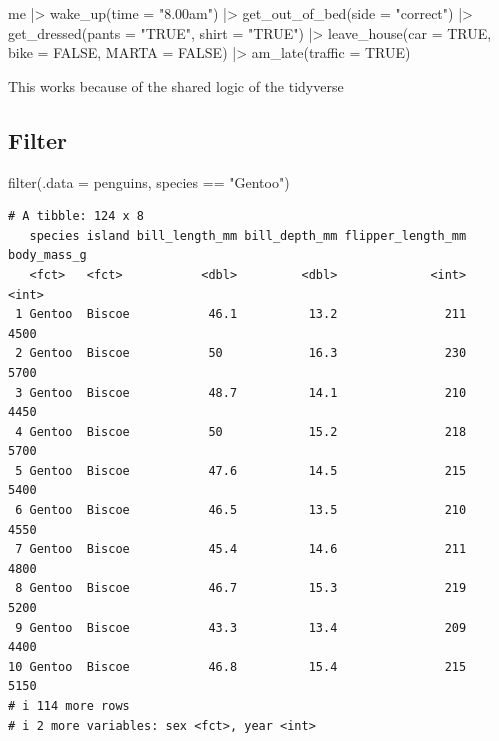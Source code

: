\documentclass[
  letterpaper,
  DIV=11,
  numbers=noendperiod,
  oneside]{scrreprt}
\newenvironment{Shaded}{\begin{snugshade}}{\end{snugshade}}
\newcommand{\AttributeTok}[1]{\textcolor[rgb]{0.40,0.45,0.13}{#1}}
\newcommand{\ConstantTok}[1]{\textcolor[rgb]{0.56,0.35,0.01}{#1}}
\newcommand{\FunctionTok}[1]{\textcolor[rgb]{0.28,0.35,0.67}{#1}}
\newcommand{\NormalTok}[1]{\textcolor[rgb]{0.00,0.23,0.31}{#1}}
\newcommand{\SpecialCharTok}[1]{\textcolor[rgb]{0.37,0.37,0.37}{#1}}
\newcommand{\StringTok}[1]{\textcolor[rgb]{0.13,0.47,0.30}{#1}}
\begin{document}

\begin{Shaded}
\begin{Highlighting}[]
\NormalTok{me }\SpecialCharTok{|\textgreater{}} 
\FunctionTok{wake\_up}\NormalTok{(}\AttributeTok{time =} \StringTok{"8.00am"}\NormalTok{) }\SpecialCharTok{|\textgreater{}} 
\FunctionTok{get\_out\_of\_bed}\NormalTok{(}\AttributeTok{side =} \StringTok{"correct"}\NormalTok{) }\SpecialCharTok{|\textgreater{}} 
\FunctionTok{get\_dressed}\NormalTok{(}\AttributeTok{pants =} \StringTok{"TRUE"}\NormalTok{, }\AttributeTok{shirt =} \StringTok{"TRUE"}\NormalTok{) }\SpecialCharTok{|\textgreater{}} 
\FunctionTok{leave\_house}\NormalTok{(}\AttributeTok{car =} \ConstantTok{TRUE}\NormalTok{, }\AttributeTok{bike =} \ConstantTok{FALSE}\NormalTok{, }\AttributeTok{MARTA =} \ConstantTok{FALSE}\NormalTok{) }\SpecialCharTok{|\textgreater{}} 
\FunctionTok{am\_late}\NormalTok{(}\AttributeTok{traffic =} \ConstantTok{TRUE}\NormalTok{)}
\end{Highlighting}
\end{Shaded}

This works because of the shared logic of the tidyverse

\subsection{Filter}

\begin{Shaded}
\begin{Highlighting}[]
\FunctionTok{filter}\NormalTok{(}\AttributeTok{.data =}\NormalTok{ penguins, species }\SpecialCharTok{==} \StringTok{"Gentoo"}\NormalTok{)}
\end{Highlighting}
\end{Shaded}

\begin{verbatim}
# A tibble: 124 x 8
   species island bill_length_mm bill_depth_mm flipper_length_mm body_mass_g
   <fct>   <fct>           <dbl>         <dbl>             <int>       <int>
 1 Gentoo  Biscoe           46.1          13.2               211        4500
 2 Gentoo  Biscoe           50            16.3               230        5700
 3 Gentoo  Biscoe           48.7          14.1               210        4450
 4 Gentoo  Biscoe           50            15.2               218        5700
 5 Gentoo  Biscoe           47.6          14.5               215        5400
 6 Gentoo  Biscoe           46.5          13.5               210        4550
 7 Gentoo  Biscoe           45.4          14.6               211        4800
 8 Gentoo  Biscoe           46.7          15.3               219        5200
 9 Gentoo  Biscoe           43.3          13.4               209        4400
10 Gentoo  Biscoe           46.8          15.4               215        5150
# i 114 more rows
# i 2 more variables: sex <fct>, year <int>
\end{verbatim}
\end{document}
